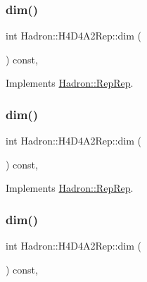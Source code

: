 \subsubsection{\texorpdfstring{dim()}{dim()}\hspace{0.1cm}{\footnotesize\ttfamily [3/5]}}
{\footnotesize\ttfamily int Hadron\+::\+H4\+D4\+A2\+Rep\+::dim (\begin{DoxyParamCaption}{ }\end{DoxyParamCaption}) const\hspace{0.3cm}{\ttfamily [inline]}, {\ttfamily [virtual]}}



Implements \mbox{\hyperlink{structHadron_1_1RepRep_a92c8802e5ed7afd7da43ccfd5b7cd92b}{Hadron\+::\+Rep\+Rep}}.

\mbox{\label{structHadron_1_1H4D4A2Rep_a6a4d1d831d61b10d0a66706229a04198}} 
\subsubsection{\texorpdfstring{dim()}{dim()}\hspace{0.1cm}{\footnotesize\ttfamily [4/5]}}
{\footnotesize\ttfamily int Hadron\+::\+H4\+D4\+A2\+Rep\+::dim (\begin{DoxyParamCaption}{ }\end{DoxyParamCaption}) const\hspace{0.3cm}{\ttfamily [inline]}, {\ttfamily [virtual]}}



Implements \mbox{\hyperlink{structHadron_1_1RepRep_a92c8802e5ed7afd7da43ccfd5b7cd92b}{Hadron\+::\+Rep\+Rep}}.

\mbox{\label{structHadron_1_1H4D4A2Rep_a6a4d1d831d61b10d0a66706229a04198}} 
\subsubsection{\texorpdfstring{dim()}{dim()}\hspace{0.1cm}{\footnotesize\ttfamily [5/5]}}
{\footnotesize\ttfamily int Hadron\+::\+H4\+D4\+A2\+Rep\+::dim (\begin{DoxyParamCaption}{ }\end{DoxyParamCaption}) const\hspace{0.3cm}{\ttfamily [inline]}, {\ttfamily [virtual]}}



